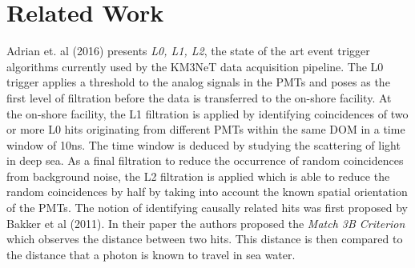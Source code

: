 \chapter{Related Work}
\label{cha:related-work}

Adrian et. al (2016) presents \emph{L0, L1, L2}, the state of the art
event trigger algorithms currently used by the KM3NeT data acquisition
pipeline. The L0 trigger applies a threshold to the analog signals in
the PMTs and poses as the first level of filtration before the data is
transferred to the on-shore facility. At the on-shore facility, the L1
filtration is applied by identifying coincidences of two or more L0
hits originating from different PMTs within the same DOM in a time
window of 10ns. The time window is deduced by studying the scattering
of light in deep sea. As a final filtration to reduce the occurrence
of random coincidences from background noise, the L2 filtration is
applied which is able to reduce the random coincidences by half by
taking into account the known spatial orientation of the PMTs. The
notion of identifying causally related hits was first proposed by
Bakker et al (2011). In their paper the authors proposed the
\emph{Match 3B Criterion} which observes the distance between two
hits. This distance is then compared to the distance that a photon is
known to travel in sea water.


